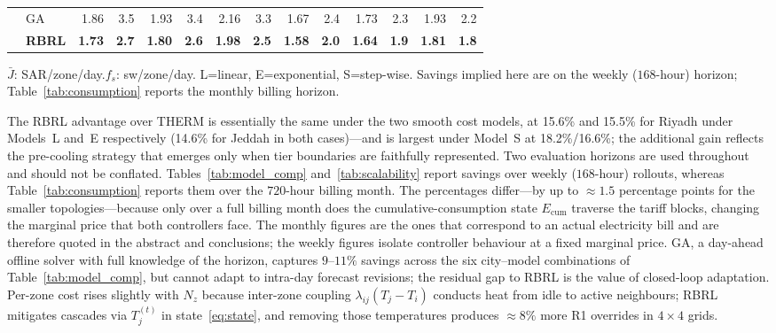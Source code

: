 \documentclass[3p,number]{elsarticle}
\newcommand{\lij}{\lambda_{ij}}
\newcommand{\Jbar}{\bar{J}}
\begin{document}
\begin{table}[!t]
\begin{tabularx}{\linewidth}{@{}lXrrrrrrrrrrrr@{}}
  & GA    & 1.86 & 3.5 & 1.93 & 3.4 & 2.16 & 3.3
          & 1.67 & 2.4 & 1.73 & 2.3 & 1.93 & 2.2 \\
  & \textbf{RBRL}
          & \textbf{1.73} & \textbf{2.7}
          & \textbf{1.80} & \textbf{2.6}
          & \textbf{1.98} & \textbf{2.5}
          & \textbf{1.58} & \textbf{2.0}
          & \textbf{1.64} & \textbf{1.9}
          & \textbf{1.81} & \textbf{1.8} \\
\bottomrule
\end{tabularx}
\vspace{2pt}
{\footnotesize\raggedright
$\Jbar$: SAR/zone/day.\quad $f_s$: sw/zone/day.\quad
L=linear, E=exponential, S=step-wise.\quad
Savings implied here are on the weekly ($168$-hour) horizon;
Table~\ref{tab:consumption} reports the monthly billing horizon.\par}
\end{table}
 
The RBRL advantage over THERM is essentially the same under the two smooth cost models, at 15.6\% and 15.5\% for Riyadh under Models~L and~E respectively (14.6\% for Jeddah in both cases)---and is largest under Model~S at 18.2\%/16.6\%; the additional gain reflects the pre-cooling strategy that emerges only when tier boundaries are faithfully represented. Two evaluation horizons are used throughout and should not be conflated. Tables~\ref{tab:model_comp} and~\ref{tab:scalability} report savings over weekly ($168$-hour) rollouts, whereas Table~\ref{tab:consumption} reports them over the $720$-hour billing month. The percentages differ---by up to ${\approx}1.5$ percentage points for the smaller topologies---because only over a full billing month does the cumulative-consumption state $E_{\mathrm{cum}}$ traverse the tariff blocks, changing the marginal price that both controllers face. The monthly figures are the ones that correspond to an actual electricity bill and are therefore quoted in the abstract and conclusions; the weekly figures isolate controller behaviour at a fixed marginal price.
GA, a day-ahead offline solver with full knowledge of the horizon, captures $9$--$11\%$ savings across the six city--model combinations of Table~\ref{tab:model_comp}, but cannot adapt to intra-day forecast revisions; the residual gap to RBRL is the value of closed-loop adaptation.
Per-zone cost rises slightly with $N_z$ because inter-zone coupling $\lij(T_j-T_i)$ conducts heat from idle to active neighbours; RBRL mitigates cascades via $T_j^{(t)}$ in state~\eqref{eq:state}, and removing those temperatures produces ${\approx}8\%$ more R1 overrides in $4\times4$ grids.
 
\end{document}
